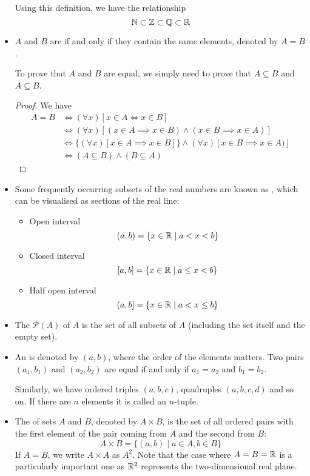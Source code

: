 \begin{itemize}
Using this definition, we have the relationship 
\[ \mathbb N \subset \mathbb Z \subset \mathbb Q \subset \mathbb R \]

\item $A$ and $B$ are  if and only if they contain the same elements, denoted by $A=B$.

To prove that $A$ and $B$ are equal, we simply need to prove that $A \subseteq B$ and $A \subseteq B$.

\begin{proof}
We have 
\begin{align*}
A = B &\iff (\forall x)[x \in A \iff x \in B] \\
&\iff (\forall x)[(x \in A \implies x \in B) \land (x \in B \implies x \in A)] \\
&\iff \{(\forall x)[x \in A \implies x \in B]\} \land {(\forall x)[x \in B \implies x \in A)]} \\
&\iff (A \subseteq B) \land (B \subseteq A)
\end{align*}
\end{proof}

\item Some frequently occurring subsets of the real numbers are known as , which can be visualised as sections of the real line:
\begin{itemize}
\item Open interval
\[ (a,b) = \{x\in\mathbb R \mid a<x<b\} \]
\item Closed interval
\[ [a,b] = \{x\in\mathbb R \mid a\le x<b\} \]
\item Half open interval
\[ (a,b] = \{x\in\mathbb R \mid a<x\le b\} \]
\end{itemize}

\item The  $\mathcal{P}(A)$ of $A$ is the set of all subsets of $A$ (including the set itself and the empty set).

\item An  is denoted by $(a,b)$, where the order of the elements matters. Two pairs $(a_1,b_1)$ and $(a_2,b_2)$ are equal if and only if $a_1=a_2$ and $b_1=b_2$. 

Similarly, we have ordered triples $(a,b,c)$, quadruples $(a,b,c,d)$ and so on. If there are $n$ elements it is called an $n$-tuple.

\item The  of sets $A$ and $B$, denoted by $A \times B$, is the set of all ordered pairs with the first element of the pair coming from $A$ and the
second from $B$:
\begin{equation}
A \times B = \{(a,b) \mid a \in A, b \in B\}
\end{equation}
If $A = B$, we write $A \times A$ as $A^2$. Note that the case where $A = B = \mathbb R$ is a particularly important one as $\mathbb R^2$ represents the two-dimensional real plane.


\end{itemize}
